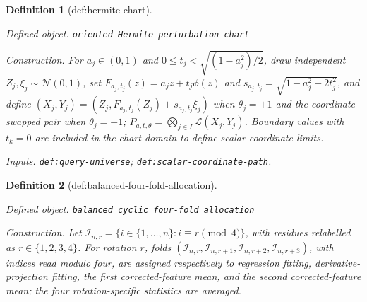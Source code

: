 \documentclass{article}
\newtheorem{definition}{Definition}
\begin{document}
\begin{definition}[def:hermite-chart]\label{def:hermite-chart}
\par\smallskip\noindent\emph{Defined object.} \texttt{oriented Hermite perturbation chart}
\par\smallskip\noindent\emph{Construction.} For \(a_j\in(0,1)\) and \(0\le t_j<\sqrt{(1-a_j^2)/2}\), draw independent \(Z_j,\xi_j\sim\mathcal N(0,1)\), set \(F_{a_j,t_j}(z)=a_jz+t_j\phi(z)\) and \(s_{a_j,t_j}=\sqrt{1-a_j^2-2t_j^2}\), and define \((X_j,Y_j)=(Z_j,F_{a_j,t_j}(Z_j)+s_{a_j,t_j}\xi_j)\) when \(\theta_j=+1\) and the coordinate-swapped pair when \(\theta_j=-1\); \(P_{a,t,\theta}=\bigotimes_{j\in I}\mathcal L(X_j,Y_j)\). Boundary values with \(t_k=0\) are included in the chart domain to define scalar-coordinate limits.
\par\smallskip\noindent\emph{Inputs.} \texttt{def:\allowbreak{}query-\allowbreak{}universe}; \texttt{def:\allowbreak{}scalar-\allowbreak{}coordinate-\allowbreak{}path}.
\end{definition}

\begin{definition}[def:balanced-four-fold-allocation]\label{def:balanced-four-fold-allocation}
\par\smallskip\noindent\emph{Defined object.} \texttt{balanced cyclic four-\allowbreak{}fold allocation}
\par\smallskip\noindent\emph{Construction.} Let \(\mathcal I_{n,r}=\{i\in\{1,\ldots,n\}:i\equiv r\pmod 4\}\), with residues relabelled as \(r\in\{1,2,3,4\}\). For rotation \(r\), folds \((\mathcal I_{n,r},\mathcal I_{n,r+1},\mathcal I_{n,r+2},\mathcal I_{n,r+3})\), with indices read modulo four, are assigned respectively to regression fitting, derivative-projection fitting, the first corrected-feature mean, and the second corrected-feature mean; the four rotation-specific statistics are averaged.
\end{definition}
\end{document}
